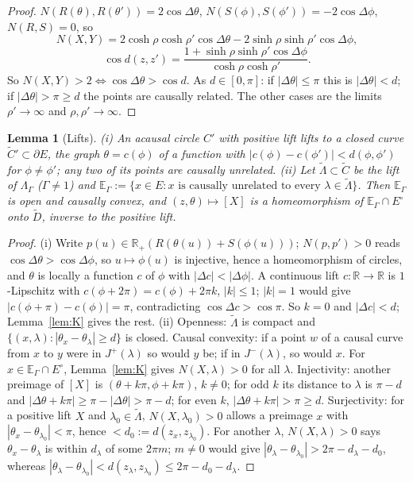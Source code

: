 \documentclass[aps,prd,onecolumn,superscriptaddress,nofootinbib,amsmath,amssymb,11pt]{revtex4-2}
\newtheorem{lemma}[theorem]{Lemma}
\theoremstyle{definition}
\newcommand{\R}{\mathbb{R}}
\newcommand{\Dt}{\tilde D}
\newcommand{\EG}{\mathbb{E}_\Gamma}
\begin{document}
\begin{proof}
$N(R(\theta),R(\theta'))=2\cos\Delta\theta$, $N(S(\phi),S(\phi'))=-2\cos\Delta\phi$, $N(R,S)=0$, so
\[
N(X,Y)=2\cosh\rho\cosh\rho'\cos\Delta\theta-2\sinh\rho\sinh\rho'\cos\Delta\phi,\]
\[
\cos d(z,z')=\frac{1+\sinh\rho\sinh\rho'\cos\Delta\phi}{\cosh\rho\cosh\rho'}.
\]
So $N(X,Y)>2\Leftrightarrow\cos\Delta\theta>\cos d$.
As $d\in[0,\pi]$: if $|\Delta\theta|\le\pi$ this is $|\Delta\theta|<d$; if $|\Delta\theta|>\pi\ge d$ the points are causally
related. The other cases are the limits $\rho'\to\infty$ and $\rho,\rho'\to\infty$.
\end{proof}

\begin{lemma}[Lifts]\label{lem:L}
(i) An acausal circle $C'$ with positive lift lifts to a closed curve $\tilde C'\subset\partial E$, the graph $\theta=c(\phi)$
of a function with $|c(\phi)-c(\phi')|<d(\phi,\phi')$ for $\phi\ne\phi'$; any two of its points are causally unrelated.
(ii) Let $\tilde\Lambda\subset\tilde C$ be the lift of $\Lambda_\Gamma$ ($\Gamma\ne1$) and
$\EG:=\{x\in E:x\text{ is causally unrelated to every }\lambda\in\tilde\Lambda\}$. Then $\EG$ is open and causally
convex, and $(z,\theta)\mapsto[X]$ is a homeomorphism of $\EG\cap E^\circ$ onto $\Dt$, inverse to the positive lift.
\end{lemma}

\begin{proof}
(i) Write $p(u)\in\R_+(R(\theta(u))+S(\phi(u)))$; $N(p,p')>0$ reads $\cos\Delta\theta>\cos\Delta\phi$, so $u\mapsto\phi(u)$ is
injective, hence a homeomorphism of circles, and $\theta$ is locally a function $c$ of $\phi$ with $|\Delta c|<|\Delta\phi|$.
A continuous lift $c:\R\to\R$ is $1$-Lipschitz with $c(\phi+2\pi)=c(\phi)+2\pi k$, $|k|\le1$; $|k|=1$ would give
$|c(\phi+\pi)-c(\phi)|=\pi$, contradicting $\cos\Delta c>\cos\pi$. So $k=0$ and $|\Delta c|<d$; Lemma~\ref{lem:K} gives the rest.
(ii) Openness: $\tilde\Lambda$ is compact and $\{(x,\lambda):|\theta_x-\theta_\lambda|\ge d\}$ is closed. Causal convexity: if
a point $w$ of a causal curve from $x$ to $y$ were in $J^+(\lambda)$ so would $y$ be; if in $J^-(\lambda)$, so would $x$.
For $x\in\EG\cap E^\circ$, Lemma~\ref{lem:K} gives $N(X,\lambda)>0$ for all $\lambda$. Injectivity: another preimage of
$[X]$ is $(\theta+k\pi,\phi+k\pi)$, $k\ne0$; for odd $k$ its distance to $\lambda$ is $\pi-d$ and
$|\Delta\theta+k\pi|\ge\pi-|\Delta\theta|>\pi-d$; for even $k$, $|\Delta\theta+k\pi|>\pi\ge d$. Surjectivity: for a positive
lift $X$ and $\lambda_0\in\tilde\Lambda$, $N(X,\lambda_0)>0$ allows a preimage $x$ with $|\theta_x-\theta_{\lambda_0}|<\pi$, hence
$<d_0:=d(z_x,z_{\lambda_0})$. For another $\lambda$, $N(X,\lambda)>0$ says $\theta_x-\theta_\lambda$ is within $d_\lambda$ of some
$2\pi m$; $m\ne0$ would give $|\theta_\lambda-\theta_{\lambda_0}|>2\pi-d_\lambda-d_0$, whereas
$|\theta_\lambda-\theta_{\lambda_0}|<d(z_\lambda,z_{\lambda_0})\le2\pi-d_0-d_\lambda$.
\end{proof}
\end{document}
